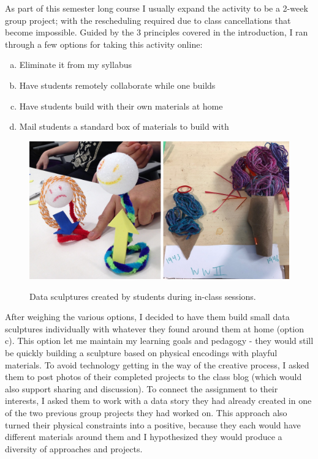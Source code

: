 \documentclass[journal]{vgtc}                %
\begin{document}
As part of this semester long course I usually expand the activity to be a 2-week group project; with the rescheduling required due to class cancellations that become impossible. Guided by the 3 principles covered in the introduction, I ran through a few options for taking this activity online:
\begin{enumerate}[(a)] %
  \itemsep0em 
  \item Eliminate it from my syllabus
  \item Have students remotely collaborate while one builds
  \item Have students build with their own materials at home
  \item Mail students a standard box of materials to build with
\end{enumerate}

\begin{figure}[h]
  \centering
  \includegraphics[scale=0.18]{figures/sculptures-in-class.jpg}
  \label{fig:sculptures_in_class}
  \setlength{\abovecaptionskip}{-7pt}
  \caption{Data sculptures created by students during in-class sessions.}
\end{figure}

After weighing the various options, I decided to have them build small data sculptures individually with whatever they found around them at home (option c). This option let me maintain my learning goals and pedagogy - they would still be quickly building a sculpture based on physical encodings with playful materials. To avoid technology getting in the way of the creative process, I asked them to post photos of their completed projects to the class blog (which would also support sharing and discussion). To connect the assignment to their interests, I asked them to work with a data story they had already created in one of the two previous group projects they had worked on. This approach also turned their physical constraints into a positive, because they each would have different materials around them and I hypothesized they would produce a diversity of approaches and projects.
\end{document}
